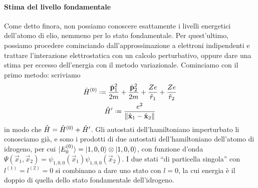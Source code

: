\paragraph{Stima del livello fondamentale}
Come detto finora, non possiamo conoscere esattamente i livelli energetici dell'atomo di elio, nemmeno per lo stato fondamentale.
Per quest'ultimo, possiamo procedere cominciando dall'approssimazione a elettroni indipendenti e trattare l'interazione elettrostatica con un calcolo perturbativo, oppure dare una stima per eccesso dell'energia con il metodo variazionale.
Cominciamo con il primo metodo: scriviamo
\begin{equation}
    \begin{gathered}
        \op H^{(0)}\defeq\frac{\op{\vec p}_1^2}{2m}+\frac{\op{\vec p}_2^2}{2m}+\frac{Ze}{\op r_1}+\frac{Ze}{\op r_2}\\
        \op H'\defeq\frac{e^2}{\norm{\op{\vec x}_1-\op{\vec x}_2}}
    \end{gathered}
    \label{eq:scomposizione-H-elio-perturbazione}
\end{equation}
in modo che $\hat{H}=\hat{H}^{(0)}+\hat{H}'$.
Gli autostati dell'hamiltoniano imperturbato li conosciamo già, e sono i prodotti di due autostati dell'hamiltoniano dell'atomo di idrogeno, per cui $\lvert E_0^{(0)}\rangle=\lvert1,0,0\rangle\otimes\lvert1,0,0\rangle$, con funzione d'onda $\Psi(\vec x_1,\vec x_2)=\psi_{1,0,0}(\vec x_1)\psi_{1,0,0}(\vec x_2)$.
I due stati ``di particella singola'' con $l^{(1)}=l^{(2)}=0$ si combinano a dare uno stato con $l=0$, la cui energia è il doppio di quella dello stato fondamentale dell'idrogeno.

